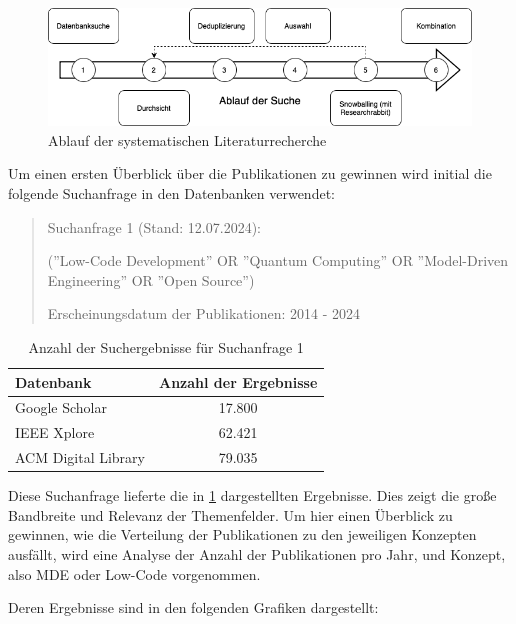 \begin{figure}[h!]
    \centering
    \includegraphics[width=1\textwidth]{graphics/ablauf_der_suche.png}
    \caption{Ablauf der systematischen Literaturrecherche}
    \label{fig:search_process}
\end{figure}

Um einen ersten Überblick über die Publikationen zu gewinnen wird initial die folgende Suchanfrage in den Datenbanken verwendet:

\begin{quote}
    Suchanfrage 1 (Stand: 12.07.2024):

    (''Low-Code Development'' OR ''Quantum Computing'' OR ''Model-Driven Engineering'' OR ''Open Source'')

    Erscheinungsdatum der Publikationen: 2014 - 2024
\end{quote}

\begin{table}[h!]
    \centering
    \caption{Anzahl der Suchergebnisse für Suchanfrage 1}
    \label{tab:search_1_results}
    \begin{tabular}{|l|c|}
    \hline
    \textbf{Datenbank} & \textbf{Anzahl der Ergebnisse} \\ \hline
    Google Scholar & 17.800 \\ \hline
    IEEE Xplore & 62.421 \\ \hline
    ACM Digital Library & 79.035 \\ \hline
    \end{tabular}
\end{table}
    
Diese Suchanfrage lieferte die in \ref{tab:search_1_results} dargestellten Ergebnisse. Dies 
zeigt die große Bandbreite und Relevanz der Themenfelder. 
Um hier einen Überblick zu gewinnen, wie die Verteilung der Publikationen zu den jeweiligen Konzepten ausfällt, 
wird eine Analyse der Anzahl der Publikationen pro Jahr, und Konzept, also MDE oder Low-Code vorgenommen.

Deren Ergebnisse sind in den folgenden Grafiken dargestellt:

